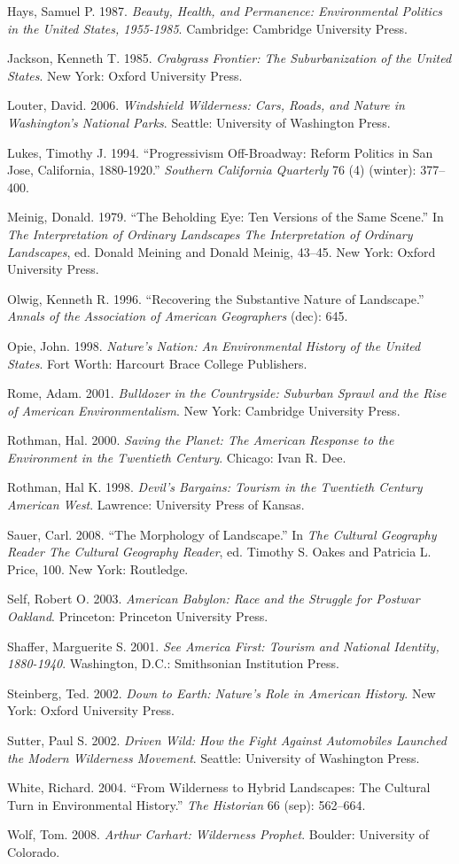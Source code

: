 \documentclass[11pt,article,oneside]{memoir}
\begin{document}
Hays, Samuel P. 1987. \emph{Beauty, Health, and Permanence:
Environmental Politics in the United States, 1955-1985}. Cambridge:
Cambridge University Press.

Jackson, Kenneth T. 1985. \emph{Crabgrass Frontier: The Suburbanization
of the United States}. New York: Oxford University Press.

Louter, David. 2006. \emph{Windshield Wilderness: Cars, Roads, and
Nature in Washington's National Parks}. Seattle: University of
Washington Press.

Lukes, Timothy J. 1994. ``Progressivism Off-Broadway: Reform Politics in
San Jose, California, 1880-1920.'' \emph{Southern California Quarterly}
76 (4) (winter): 377--400.

Meinig, Donald. 1979. ``The Beholding Eye: Ten Versions of the Same
Scene.'' In \emph{The Interpretation of Ordinary Landscapes The
Interpretation of Ordinary Landscapes}, ed. Donald Meining and Donald
Meinig, 43--45. New York: Oxford University Press.

Olwig, Kenneth R. 1996. ``Recovering the Substantive Nature of
Landscape.'' \emph{Annals of the Association of American Geographers}
(dec): 645.

Opie, John. 1998. \emph{Nature's Nation: An Environmental History of the
United States}. Fort Worth: Harcourt Brace College Publishers.

Rome, Adam. 2001. \emph{Bulldozer in the Countryside: Suburban Sprawl
and the Rise of American Environmentalism}. New York: Cambridge
University Press.

Rothman, Hal. 2000. \emph{Saving the Planet: The American Response to
the Environment in the Twentieth Century}. Chicago: Ivan R. Dee.

Rothman, Hal K. 1998. \emph{Devil's Bargains: Tourism in the Twentieth
Century American West}. Lawrence: University Press of Kansas.

Sauer, Carl. 2008. ``The Morphology of Landscape.'' In \emph{The
Cultural Geography Reader The Cultural Geography Reader}, ed. Timothy S.
Oakes and Patricia L. Price, 100. New York: Routledge.

Self, Robert O. 2003. \emph{American Babylon: Race and the Struggle for
Postwar Oakland}. Princeton: Princeton University Press.

Shaffer, Marguerite S. 2001. \emph{See America First: Tourism and
National Identity, 1880-1940}. Washington, D.C.: Smithsonian Institution
Press.

Steinberg, Ted. 2002. \emph{Down to Earth: Nature's Role in American
History}. New York: Oxford University Press.

Sutter, Paul S. 2002. \emph{Driven Wild: How the Fight Against
Automobiles Launched the Modern Wilderness Movement}. Seattle:
University of Washington Press.

White, Richard. 2004. ``From Wilderness to Hybrid Landscapes: The
Cultural Turn in Environmental History.'' \emph{The Historian} 66 (sep):
562--664.

Wolf, Tom. 2008. \emph{Arthur Carhart: Wilderness Prophet}. Boulder:
University of Colorado.
\end{document}
